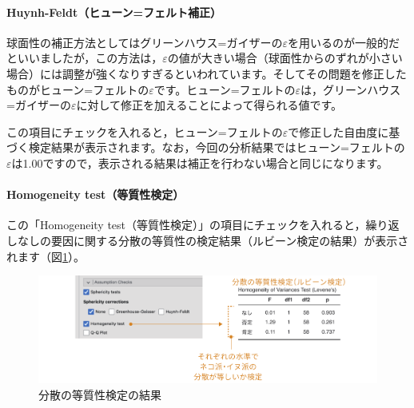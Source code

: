 \documentclass[
  12pt,
  a5jpaper,
  lualatex, ja=standard]{bxjsbook}
\begin{document}
\hypertarget{huynh-feldtux30d2ux30e5ux30fcux30f3ux30d5ux30a7ux30ebux30c8ux88dcux6b63}{%
\paragraph*{Huynh-Feldt（ヒューン=フェルト補正）}\label{huynh-feldtux30d2ux30e5ux30fcux30f3ux30d5ux30a7ux30ebux30c8ux88dcux6b63}}

球面性の補正方法としてはグリーンハウス=ガイザーの\(\varepsilon\)を用いるのが一般的だといいましたが，この方法は，\(\varepsilon\)の値が大きい場合（球面性からのずれが小さい場合）には調整が強くなりすぎるといわれています。そしてその問題を修正したものがヒューン=フェルトの\(\varepsilon\)です。ヒューン=フェルトの\(\varepsilon\)は，グリーンハウス=ガイザーの\(\varepsilon\)に対して修正を加えることによって得られる値です。

この項目にチェックを入れると，ヒューン=フェルトの\(\varepsilon\)で修正した自由度に基づく検定結果が表示されます。なお，今回の分析結果ではヒューン=フェルトの\(\varepsilon\)は1.00ですので，表示される結果は補正を行わない場合と同じになります。

\hypertarget{homogeneity-testux7b49ux8ceaux6027ux691cux5b9a-2}{%
\paragraph*{Homogeneity test（等質性検定）}\label{homogeneity-testux7b49ux8ceaux6027ux691cux5b9a-2}}

この「Homogeneity test（等質性検定）」の項目にチェックを入れると，繰り返しなしの要因に関する分散の等質性の検定結果（ルビーン検定の結果）が表示されます（図\ref{fig:ANOVA-rm-homogeneity}）。

\begin{figure}[!ht]

{\centering \includegraphics[width=1\linewidth]{images/ANOVA/rm-homogeneity} 

}

\caption{分散の等質性検定の結果}\label{fig:ANOVA-rm-homogeneity}
\end{figure}
\end{document}
